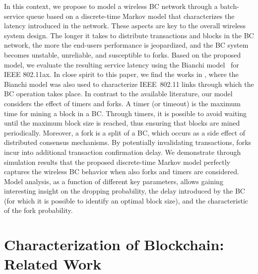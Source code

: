 \documentclass[conference]{IEEEtran}
\theoremstyle{definition}
\begin{document}
In this context, we propose to model a wireless BC network through a batch-service queue based on a discrete-time Markov model that characterizes the latency introduced in the network. These aspects are key to the overall wireless system design. The longer it takes to distribute transactions and blocks in the BC network, the more the end-users performance is jeopardized, and the BC system becomes unstable, unreliable, and susceptible to forks. Based on the proposed model, we evaluate the resulting service latency using the Bianchi model~\cite{bianchi2000performance} for IEEE 802.11ax. In close spirit to this paper, we find the works in \cite{cao2019does,ngubo2020wi}, where the Bianchi model was also used to characterize IEEE~802.11 links through which the BC operation takes place. In contrast to the available literature, our model considers the effect of timers and forks. A timer (or timeout) is the maximum time for mining a block in a BC. Through timers, it is possible to avoid waiting until the maximum block size is reached, thus ensuring that blocks are mined periodically. Moreover, a fork is a split of a BC, which occurs as a side effect of distributed consensus mechanisms. By potentially invalidating transactions, forks incur into additional transaction confirmation delay. We demonstrate through simulation results that the proposed discrete-time Markov model perfectly captures the wireless BC behavior when also forks and timers are considered. Model analysis, as a function of different key parameters, allows gaining interesting insight on the dropping probability, the delay introduced by the BC (for which it is possible to identify an optimal block size), and the characteristic of the fork probability.

\section{Characterization of Blockchain:\\Related Work}
\label{section:related_work}
\end{document}
